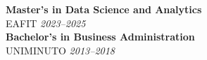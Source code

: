 \textbf{Master’s in Data Science and Analytics} \\
EAFIT \hfill \textit{2023–2025} \\[-0.4em]

\textbf{Bachelor’s in Business Administration} \\
UNIMINUTO \hfill \textit{2013–2018}
